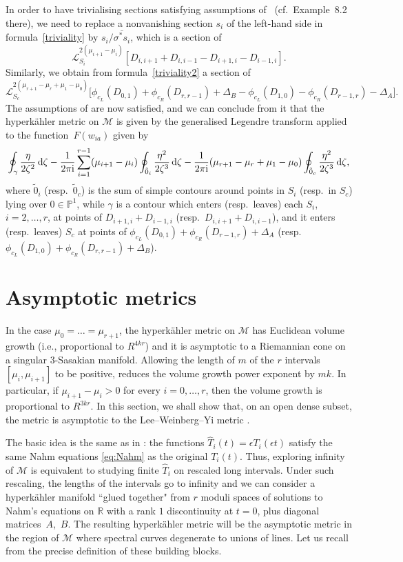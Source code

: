 \documentclass[pdftex]{sigma}
\newcommand{\ol}{\overline}
\numberwithin{equation}{section}
\newcommand{\oP}{{\mathbb{P}}}
\newcommand{\oR}{{\mathbb{R}}}
\newcommand{\sM}{{\mathcal{M}}} %
\begin{document}
{ In order to have trivialising sections satisfying {assumptions} of~\cite[Theorem~7.5]{BielGZ} (cf.\ Example~8.2 there), we need to replace a nonvanishing section $s_i$ of the left-hand side in formula~\eqref{triviality} by $s_i/\ol{\sigma^\ast s_i}$, which is a section of
\[
\mathscr{L}_{S_i}^{2(\mu_{i+1}-\mu_{i})}[D_{i,i+1}+D_{i,i-1}-D_{i+1,i}-D_{i-1,i}].
\]
 Similarly, we obtain from formula~\eqref{triviality2} a section of
\[
\mathscr{L}_{S_c}^{2(\mu_{r+1}-\mu_r+\mu_1-\mu_0)}\bigl[\phi_{c_L} (D_{0,1} ) +\phi_{c_R} (D_{r,r-1} )+\Delta_B -\phi_{c_L} (D_{1,0} ) -\phi_{c_R} (D_{r-1,r} )-\Delta_A\bigr].
\]
 The assumptions of \cite[Theorem~7.5]{BielGZ} are now satisfied, and we can conclude from it that the hyperk\"ahler metric on $\sM$ is given by the generalised Legendre transform applied to {the function~$F(w_{ia})$ given by}
\[
\oint_\gamma \frac{\eta}{2\zeta^2}\,{\rm d}\zeta
-\frac{1}{2\pi {\rm i}}\sum_{i=1}^{r-1}(\mu_{i+1}-\mu_{i})\oint_{\tilde 0_i}\frac{\eta^2}{2\zeta^3}\,{\rm d}\zeta-\frac{1}{2\pi {\rm i}}(\mu_{r+1}-\mu_r+\mu_1-\mu_0)\oint_{\tilde 0_c}\frac{\eta^2}{2\zeta^3}\,{\rm d}\zeta,
\]
 where $\tilde 0_i$ (resp.~$\tilde 0_c$) is the sum of simple contours around points in $S_i$ (resp.~in $S_c$) lying over ${0\in\oP^1}$, while $\gamma$ is a contour which enters (resp.~leaves) each $S_i$, $i=2,\dots,r$, at points of $D_{i+1,i}+D_{i-1,i}$
 (resp.~$D_{i,i+1}+D_{i,i-1}$), and it enters (resp.~leaves) $S_c$ at points of $\phi_{c_L}(D_{0,1}) +\phi_{c_R}(D_{r-1,r})+\Delta_A$ (resp.~$\phi_{c_L}(D_{1,0})+\phi_{c_R}(D_{r,r-1})+\Delta_B$).


 \section{Asymptotic metrics}\label{Sec:Asymp}
 In the case $\mu_0=\dots=\mu_{r+1}$, the hyperk\"ahler metric on $\sM$ has Euclidean volume growth (i.e., proportional to $ R^{4kr}$) and it is asymptotic to a Riemannian cone on a singular $3$-Sasakian manifold. Allowing the length of $m$ of the $r$ intervals $[\mu_i,\mu_{i+1}]$ to be positive, reduces the volume growth {power exponent by} $mk$. In particular, if $\mu_{i+1}-\mu_i>0$ for every $i=0,\dots,r$, then the volume growth is
 proportional to $R^{3kr}$. In this section, we shall show that, on an open dense subset, the metric is asymptotic to the Lee--Weinberg--Yi metric \cite{LWY}.

 The basic idea is the same as in \cite{BSU}: the functions $\hat{T}_i(t)=\epsilon T_i(\epsilon t)$ satisfy the same Nahm equations \eqref{eq:Nahm} as the original $T_i(t)$. Thus, exploring infinity of $\sM$ is equivalent to studying finite $\hat{T}_i$ on rescaled long intervals.
Under such rescaling, the lengths of the intervals go to infinity and we can consider a hyperk\"ahler manifold ``glued together" from $r$ moduli spaces of solutions to Nahm's equations on $\oR$ with a rank $1$ {discontinuity} at $t=0$, plus diagonal matrices~$A$,~$B$. The resulting hyperk\"ahler metric will be the asymptotic metric in the region of $\sM$ where spectral curves degenerate to unions of lines. Let us recall from \cite{BSU} the precise definition of these building blocks.

}
\end{document}
